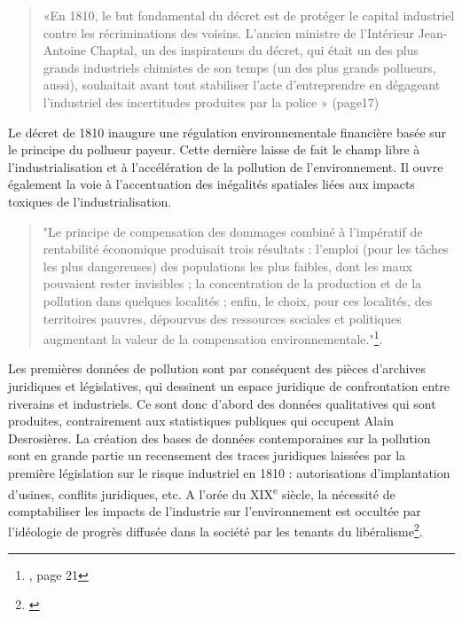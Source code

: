 \documentclass[a4paper,twoside,12pt]{book}
\newcommand{\siecle}[1]{\textsc{#1}\textsuperscript{e} siècle}
\begin{document}
\begin{quote}«En 1810, le but fondamental du décret est de protéger le capital industriel contre les récriminations des voisins. L’ancien ministre de l’Intérieur Jean-Antoine Chaptal, un des inspirateurs du décret, qui était un des plus grands industriels chimistes de son temps (un des plus grands pollueurs, aussi), souhaitait avant tout stabiliser l’acte d’entreprendre en dégageant l’industriel des incertitudes produites par la police » (page17) 
\end{quote} 
Le décret de 1810 inaugure une régulation environnementale financière basée sur le principe du pollueur payeur. Cette dernière laisse de fait le champ libre à l'industrialisation et à l'accélération de la pollution de l'environnement. Il ouvre également la voie à l'accentuation des inégalités spatiales liées aux impacts toxiques de l'industrialisation. 
\vspace{1em} 
\begin{quote}"Le principe de compensation des dommages combiné à l’impératif de rentabilité économique produisait trois résultats : l’emploi (pour les tâches les plus dangereuses) des populations les plus faibles, dont les maux pouvaient rester invisibles ; la concentration de la production et de la pollution dans quelques localités ; enfin, le choix, pour ces localités, des territoires pauvres, dépourvus des ressources sociales et politiques augmentant la valeur de la compensation environnementale."\footnote{\cite{fressoz_decret_2011}, page 21}. 
\end{quote}
\vspace{1em}
Les premières données de pollution sont par conséquent des pièces d'archives juridiques et législatives, qui dessinent un espace juridique de confrontation entre riverains et industriels. Ce sont donc d'abord des données qualitatives qui sont produites, contrairement aux statistiques publiques qui occupent Alain Desrosières. La création des bases de données contemporaines sur la pollution sont en grande partie un recensement des traces juridiques laissées par la première législation sur le risque industriel en 1810 : autorisations d'implantation d'usines, conflits juridiques, etc. A l'orée du \siecle{XIX}, la nécessité de comptabiliser les impacts de l'industrie sur l'environnement est occultée par l'idéologie de progrès diffusée dans la société par les tenants du libéralisme\footnote{\cite{jarrige_contamination_2017}}. 
\end{document}
